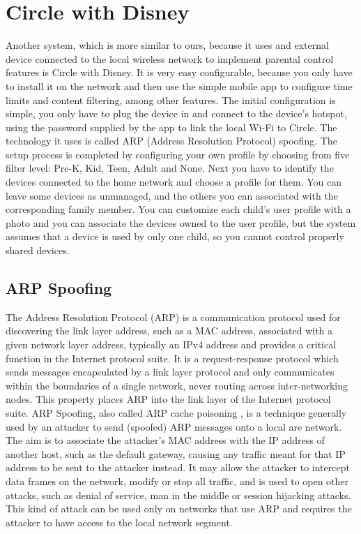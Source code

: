 \section{Circle with Disney}

Another system, which is more similar to ours, because it uses and external device connected to the local wireless network to implement parental control features is Circle with Disney. \citep{circleWithDisney} It is very easy configurable, because you only have to install it on the network and then use the simple mobile app to configure time limits and content filtering, among other features. The initial configuration is simple, you only have to plug the device in and connect to the device's hotspot, using the password supplied by the app to link the local Wi-Fi to Circle. The technology it uses is called ARP (Address Resolution Protocol) spoofing. \citep{braden1989rfc} The setup process is completed by configuring your own profile by choosing from five filter level: Pre-K, Kid, Teen, Adult and None. Next you have to identify the devices connected to the home network and choose a profile for them. You can leave some devices as unmanaged, and the others you can associated with the corresponding family member. You can customize each child's user profile with a photo and you can associate the devices owned to the user profile, but the system assumes that a device is used by only one child, so you cannot control properly shared devices. \parencite{circlePCMag}

\subsection{ARP Spoofing}

The Address Resolution Protocol (ARP) is a communication protocol used for discovering the link layer address, such as a MAC address, associated with a given network layer address, typically an IPv4 address and provides a critical function in the Internet protocol suite. \parencite{plummer1982ethernet} It is a request-response protocol which sends messages encapsulated by a link layer protocol and only communicates within the boundaries of a single network, never routing across inter-networking nodes. This property places ARP into the link layer of the Internet protocol suite. \citep{braden1989rfc} ARP Spoofing, also called ARP cache poisoning \citep{lockhart2004network}, is a technique generally used by an attacker to send (spoofed) ARP messages onto a local are network. The aim is to associate the attacker's MAC address with the IP address of another host, such as the default gateway, causing any traffic meant for that IP address to be sent to the attacker instead. It may allow the attacker to intercept data frames on the network, modify or stop all traffic, and is used to open other attacks, such as denial of service, man in the middle or session hijacking attacks. \parencite{ramachandran2005detecting} This kind of attack can be used only on networks that use ARP and requires the attacker to have access to the local network segment. \parencite{lockhart2004network}

